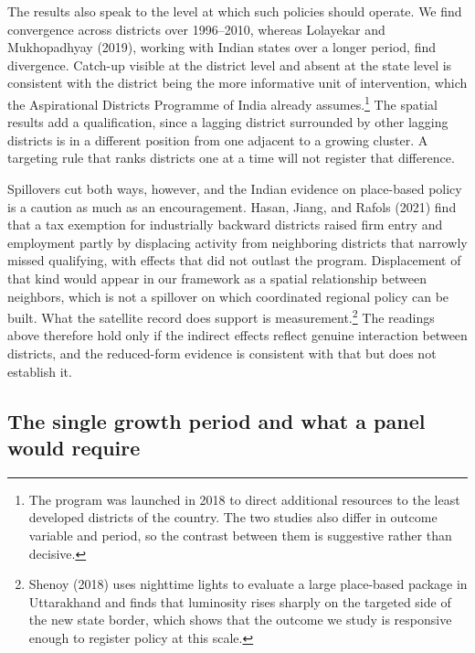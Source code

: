 \documentclass[
  letterpaper,
  DIV=11,
  numbers=noendperiod]{scrartcl}
\begin{document}
The results also speak to the level at which such policies should
operate. We find convergence across districts over 1996--2010, whereas
Lolayekar and Mukhopadhyay (2019), working with Indian states over a
longer period, find divergence. Catch-up visible at the district level
and absent at the state level is consistent with the district being the
more informative unit of intervention, which the Aspirational Districts
Programme of India already assumes.\footnote{The program was launched in
  2018 to direct additional resources to the least developed districts
  of the country. The two studies also differ in outcome variable and
  period, so the contrast between them is suggestive rather than
  decisive.} The spatial results add a qualification, since a lagging
district surrounded by other lagging districts is in a different
position from one adjacent to a growing cluster. A targeting rule that
ranks districts one at a time will not register that difference.

Spillovers cut both ways, however, and the Indian evidence on
place-based policy is a caution as much as an encouragement. Hasan,
Jiang, and Rafols (2021) find that a tax exemption for industrially
backward districts raised firm entry and employment partly by displacing
activity from neighboring districts that narrowly missed qualifying,
with effects that did not outlast the program. Displacement of that kind
would appear in our framework as a spatial relationship between
neighbors, which is not a spillover on which coordinated regional policy
can be built. What the satellite record does support is
measurement.\footnote{Shenoy (2018) uses nighttime lights to evaluate a
  large place-based package in Uttarakhand and finds that luminosity
  rises sharply on the targeted side of the new state border, which
  shows that the outcome we study is responsive enough to register
  policy at this scale.} The readings above therefore hold only if the
indirect effects reflect genuine interaction between districts, and the
reduced-form evidence is consistent with that but does not establish it.

\subsection{The single growth period and what a panel would
require}\label{the-single-growth-period-and-what-a-panel-would-require}
\end{document}
